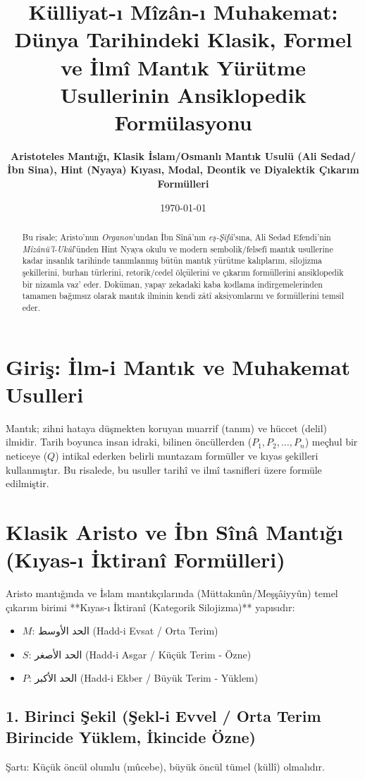 \documentclass[11pt, a4paper]{article}
\title{\textbf{Külliyat-ı Mîzân-ı Muhakemat: Dünya Tarihindeki Klasik, Formel ve İlmî Mantık Yürütme Usullerinin Ansiklopedik Formülasyonu}}
\author{\textbf{Aristoteles Mantığı, Klasik İslam/Osmanlı Mantık Usulü (Ali Sedad/İbn Sina), Hint (Nyaya) Kıyası, Modal, Deontik ve Diyalektik Çıkarım Formülleri}}
\date{\today}
\begin{document}
\maketitle

\begin{abstract}
Bu risale; Aristo'nun \textit{Organon}'undan İbn Sînâ'nın \textit{eş-Şifâ}'sına, Ali Sedad Efendi'nin \textit{Mîzânü'l-Ukûl}'ünden Hint Nyaya okulu ve modern sembolik/felsefî mantık usullerine kadar insanlık tarihinde tanımlanmış bütün mantık yürütme kalıplarını, silojizma şekillerini, burhan türlerini, retorik/cedel ölçülerini ve çıkarım formüllerini ansiklopedik bir nizamla vaz' eder. Doküman, yapay zekadaki kaba kodlama indirgemelerinden tamamen bağımsız olarak mantık ilminin kendi zâtî aksiyomlarını ve formüllerini temsil eder.
\end{abstract}

\tableofcontents
\newpage

\section{Giriş: İlm-i Mantık ve Muhakemat Usulleri}

Mantık; zihni hataya düşmekten koruyan muarrif (tanım) ve hüccet (delil) ilmidir. Tarih boyunca insan idraki, bilinen öncüllerden ($P_1, P_2, \dots, P_n$) meçhul bir neticeye ($Q$) intikal ederken belirli muntazam formüller ve kıyas şekilleri kullanmıştır. Bu risalede, bu usuller tarihî ve ilmî tasnifleri üzere formüle edilmiştir.

\section{Klasik Aristo ve İbn Sînâ Mantığı (Kıyas-ı İktiranî Formülleri)}

Aristo mantığında ve İslam mantıkçılarında (Müttakınûn/Meşşâiyyûn) temel çıkarım birimi **Kıyas-ı İktiranî (Kategorik Silojizma)** yapısıdır:
\begin{itemize}
    \item $M$: الحد الأوسط (Hadd-i Evsat / Orta Terim)
    \item $S$: الحد الأصغر (Hadd-i Asgar / Küçük Terim - Özne)
    \item $P$: الحد الأكبر (Hadd-i Ekber / Büyük Terim - Yüklem)
\end{itemize}

\subsection{1. Birinci Şekil (Şekl-i Evvel / Orta Terim Birincide Yüklem, İkincide Özne)}
Şartı: Küçük öncül olumlu (mûcebe), büyük öncül tümel (küllî) olmalıdır.
\end{document}
